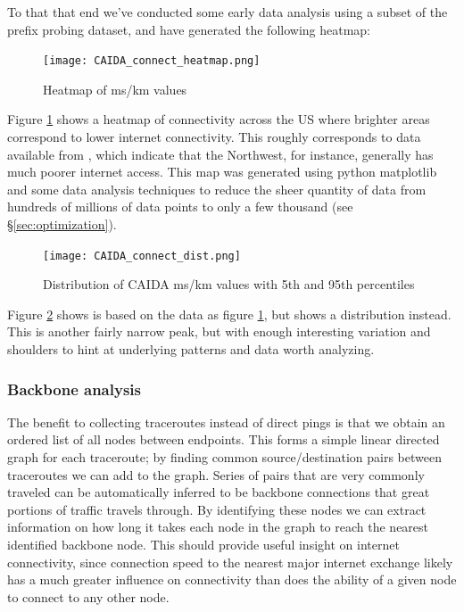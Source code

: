 To that that end we've conducted some early data analysis using a subset of the \caida prefix probing dataset, and have generated the following heatmap:

\begin{figure}[H]
    \centering
    \texttt{[image: CAIDA\_connect\_heatmap.png]}
    \caption{Heatmap of ms/km values}
    \label{fig:caida_connectivity_heatmap}
\end{figure}

Figure \ref{fig:caida_connectivity_heatmap} shows a heatmap of connectivity across the US where brighter areas correspond to lower internet connectivity. This roughly corresponds to data available from \isps, which indicate that the Northwest, for instance, generally has much poorer internet access. This map was generated using python matplotlib and some data analysis techniques to reduce the sheer quantity of data from hundreds of millions of data points to only a few thousand (see \S{}\ref{sec:optimization}).

\begin{figure}[H]
    \centering
    \texttt{[image: CAIDA\_connect\_dist.png]}
    \caption{Distribution of CAIDA ms/km values with 5th and 95th percentiles}
    \label{fig:caida_connectivity_dist}
\end{figure}

Figure \ref{fig:caida_connectivity_dist} shows is based on the data as figure \ref{fig:caida_connectivity_heatmap}, but shows a distribution instead. This is another fairly narrow peak, but with enough interesting variation and shoulders to hint at underlying patterns and data worth analyzing.

\subsubsection{Backbone analysis}

The benefit to collecting traceroutes instead of direct pings is that we obtain an ordered list of all nodes between endpoints. This forms a simple linear directed graph for each traceroute; by finding common source/destination pairs between traceroutes we can add to the graph. Series of pairs that are very commonly traveled can be automatically inferred to be backbone connections that great portions of traffic travels through. By identifying these nodes we can extract information on how long it takes each node in the graph to reach the nearest identified backbone node. This should provide useful insight on internet connectivity, since connection speed to the nearest major internet exchange likely has a much greater influence on connectivity than does the ability of a given node to connect to any other node.

